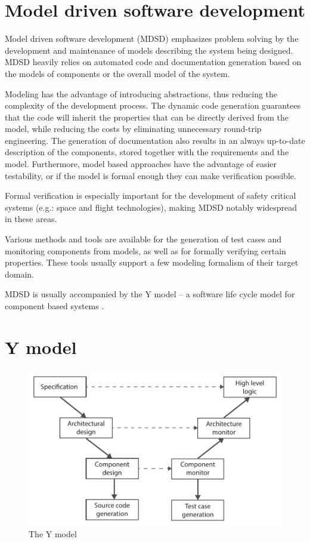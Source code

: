 \section*{Model driven software development}

Model driven software development (MDSD) emphasizes problem solving by the development and maintenance of models describing the system being designed. MDSD heavily relies on automated code and documentation generation based on the models of components or the overall model of the system. 

Modeling has the advantage of introducing abstractions, thus reducing the complexity of the development process. The dynamic code generation guarantees that the code will inherit the properties that can be directly derived from the model, while reducing the costs by eliminating unnecessary round-trip engineering. The generation of documentation also results in an always up-to-date description of the components, stored together with the requirements and the model. Furthermore, model based approaches have the advantage of easier testability, or if the model is formal enough they can make verification possible.

Formal verification is especially important for the development of safety critical systems (e.g.: space and flight technologies), making MDSD notably widespread in these areas.

Various methods and tools are available for the generation of test cases and monitoring components from models, as well as for formally verifying certain properties. These tools usually support a few modeling formalism of their target domain.

MDSD is usually accompanied by the Y model -- a software life cycle model for component based systems \citep{ymodel}.

\section*{Y model} %

\begin{figure}[h]
	\centering
	\includegraphics[width=0.8\linewidth]{include/figures/chapter_1/YModel}
	\caption{The Y model}
	\label{fig:intro:vmodel}
\end{figure}

